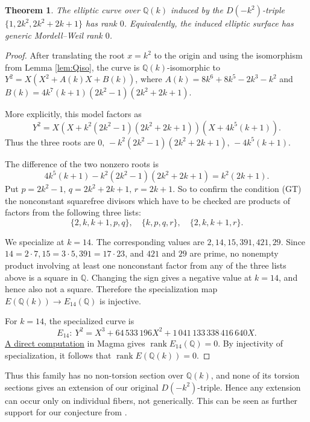 \documentclass{article}
\theoremstyle{plain}
\newtheorem{theorem}{Theorem}
\newcommand{\Q}{\mathbb{Q}}
\begin{document}
\begin{theorem}
The elliptic curve over \(\Q(k)\) induced by the
\(D(-k^2)\)-triple \(\{1,2k^2,2k^2+2k+1\}\) has rank \(0\).
Equivalently, the induced elliptic surface has generic Mordell--Weil rank \(0\).
\end{theorem}
\begin{proof}
After translating the root \(x=k^2\) to the origin and using the isomorphism from
Lemma \ref{lem:Qiso}, the curve is \(\Q(k)\)-isomorphic to
\(Y^2=X(X^2+A(k)X+B(k))\), where
\(A(k)=8k^6+8k^5-2k^3-k^2\) and
\(B(k)=4k^7(k+1)(2k^2-1)(2k^2+2k+1)\).

More explicitly, this model factors as
\[
Y^2=X(X+k^2(2k^2-1)(2k^2+2k+1))(X+4k^5(k+1)).
\]
Thus the three roots are
\( 0,\, -k^2(2k^2-1)(2k^2+2k+1), \, -4k^5(k+1)\).

The difference of the two nonzero roots is
\[
4k^5(k+1)-k^2(2k^2-1)(2k^2+2k+1)=k^2(2k+1).
\]
Put
\( p=2k^2-1,\, q=2k^2+2k+1,\, r=2k+1\).
So to confirm the condition (GT) the nonconstant squarefree divisors which have to be checked are products
of factors from the following three lists:
\[
\{2,k,k+1,p,q\},\quad \{k,p,q,r\},\quad \{2,k,k+1,r\}.
\]

We specialize at \(k=14\). The corresponding values are
\( 2, 14, 15, 391, 421, 29 \).
Since
\( 14=2\cdot 7, 15=3\cdot 5, 391=17\cdot 23\),
and \(421\) and \(29\) are prime, no nonempty product involving at least one
nonconstant factor from any of the three lists above is a square in \(\Q\).
Changing the sign gives a negative value at \(k=14\), and hence also not a square.
Therefore the specialization map
\( E(\Q(k))\to E_{14}(\Q) \)
is injective.

For \(k=14\), the specialized curve is
\[
E_{14}:\ Y^2=X^3+64\,533\,196X^2+1\,041\,133\,338\,416\,640X.
\]
\href{https://github.com/NikolaAdzaga/TorsionRegularTriples/blob/main/generic_rank_0.m}{A direct computation} in {\sc Magma} gives
\(\operatorname{rank} E_{14}(\Q)=0\). By injectivity of specialization,
it follows that \(\operatorname{rank} E(\Q(k))=0\).
\end{proof}

Thus this family has no non-torsion section over \(\Q(k)\), and none of its torsion sections gives an extension of our original \(D(-k^2)\)-triple. Hence any extension can occur only on individual fibers, not generically. This can be seen as further support for our conjecture from \cite{AF}.
\end{document}

